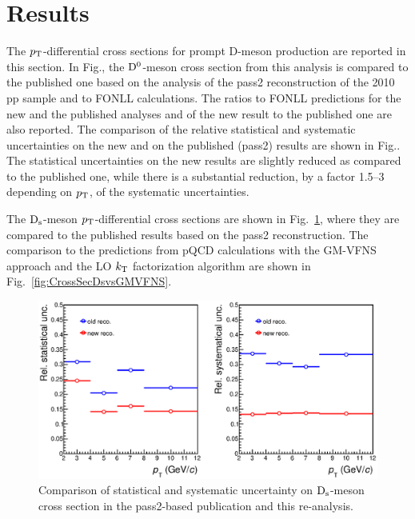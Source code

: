 \section{Results}
The $p_{\rm T}$-differential cross sections for prompt D-meson production
are reported in this section.
In Fig., the ${\rm D^0}$-meson cross section
from this analysis is compared to the published one based on the analysis of 
the pass2 reconstruction of the 2010 pp sample and to FONLL calculations.
The ratios to FONLL predictions for the new and the published analyses
and of the new result to the published one are also reported.
The comparison of the relative statistical and systematic uncertainties
on the new and on the published (pass2) results are shown in 
Fig..
The statistical uncertainties on the new results are slightly reduced as
compared to the published one, while there is a substantial reduction, 
by a factor 1.5--3 depending on $p_{\rm T}$, of the systematic uncertainties.



The ${\rm D_s}$-meson $p_{\rm T}$-differential cross sections are shown in 
Fig.~\ref{fig:CrossSecDs2vs4}, where they are compared to the
published results based on the pass2 reconstruction.
The comparison to the predictions from pQCD calculations with the
GM-VFNS approach and the LO $k_{\rm T}$ factorization 
algorithm are shown in Fig.~\ref{fig:CrossSecDsvsGMVFNS}.


\begin{figure}[!htb]
\begin{center}
\includegraphics[width=.99\textwidth]{FigCap4/uncertainties_pass2_pass4.eps}
\caption{Comparison of statistical and systematic uncertainty on ${\rm D_s}$-meson
cross section in the pass2-based publication and this re-analysis.}
\label{fig:CrossSecDs2vs4}
\end{center}
\end{figure}

